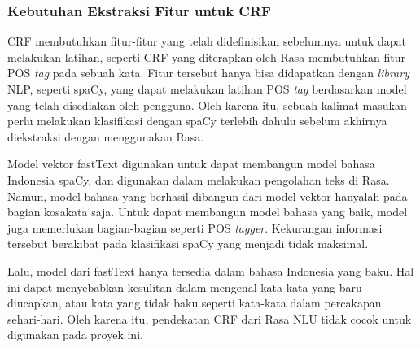 \subsubsection{Kebutuhan Ekstraksi Fitur untuk CRF}

CRF membutuhkan fitur-fitur yang telah didefinisikan sebelumnya untuk dapat melakukan latihan, seperti CRF yang diterapkan oleh Rasa membutuhkan fitur POS \textit{tag} pada sebuah kata. Fitur tersebut hanya bisa didapatkan dengan \textit{library} NLP, seperti spaCy, yang dapat melakukan latihan POS \textit{tag} berdasarkan model yang telah disediakan oleh pengguna. Oleh karena itu, sebuah kalimat masukan perlu melakukan klasifikasi dengan spaCy terlebih dahulu sebelum akhirnya diekstraksi dengan menggunakan Rasa.

Model vektor fastText digunakan untuk dapat membangun model bahasa Indonesia spaCy, dan digunakan dalam melakukan pengolahan teks di Rasa. Namun, model bahasa yang berhasil dibangun dari model vektor hanyalah pada bagian kosakata saja. Untuk dapat membangun model bahasa yang baik, model juga memerlukan bagian-bagian seperti POS \textit{tagger}. Kekurangan informasi tersebut berakibat pada klasifikasi spaCy yang menjadi tidak maksimal.

Lalu, model dari fastText hanya tersedia dalam bahasa Indonesia yang baku. Hal ini dapat menyebabkan kesulitan dalam mengenal kata-kata yang baru diucapkan, atau kata yang tidak baku seperti kata-kata dalam percakapan sehari-hari. Oleh karena itu, pendekatan CRF dari Rasa NLU tidak cocok untuk digunakan pada proyek ini.

%
%
%
